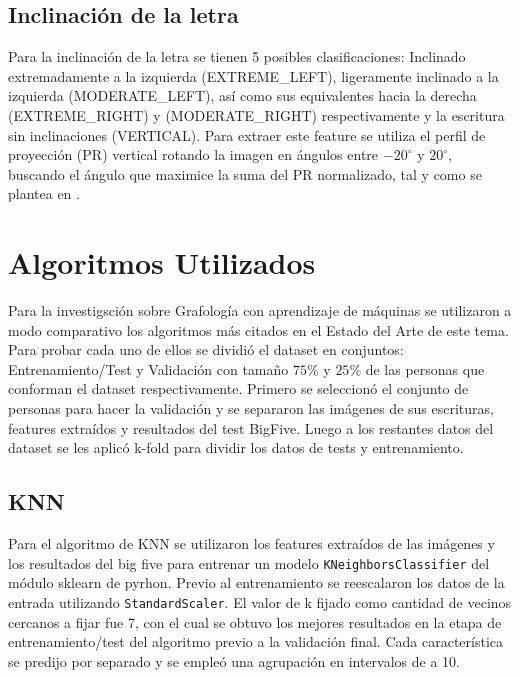 \documentclass[10pt, a4paper]{article}
\begin{document}
        \subsection{Inclinaci\'on de la letra}
            Para la inclinaci\'on de la letra se tienen 5 posibles clasificaciones: Inclinado extremadamente a la izquierda (EXTREME\_LEFT), ligeramente inclinado a la 
            izquierda (MODERATE\_LEFT), as\'i como sus equivalentes hacia la derecha (EXTREME\_RIGHT) y (MODERATE\_RIGHT) respectivamente y la escritura sin inclinaciones (VERTICAL). 
            Para extraer este feature se utiliza el perfil de proyecci\'on (PR) vertical rotando la imagen en \'angulos entre $-20^{\circ}$ y $20^{\circ}$, buscando el \'angulo que maximice
            la suma del PR normalizado, tal y como se plantea en \cite{gavrilescu2018predicting}.

    \section{Algoritmos Utilizados}
        Para la investigsci\'on sobre Grafolog\'ia con aprendizaje de m\'aquinas se utilizaron a modo comparativo los algoritmos m\'as citados en el Estado del Arte de este tema. 
        Para probar cada uno de ellos se dividi\'o el dataset en  conjuntos: Entrenamiento/Test y Validaci\'on con tama\~no $75\%$ y $25\%$ de las personas que conforman el dataset respectivamente.
        Primero se seleccion\'o el conjunto de personas para hacer la validaci\'on y se separaron las im\'agenes de sus escrituras, features extra\'idos y resultados del test BigFive. Luego a los restantes datos del dataset 
        se les aplic\'o k-fold para dividir los datos de tests y entrenamiento.  
        
        \subsection{KNN}
            Para el algoritmo de KNN se utilizaron los features extra\'idos de las im\'agenes y los resultados del big five para entrenar un modelo \texttt{KNeighborsClassifier} del m\'odulo sklearn de pyrhon. 
            Previo al entrenamiento se reescalaron los datos de la entrada utilizando \texttt{StandardScaler}. El valor de k fijado como cantidad de vecinos cercanos a fijar fue 7, con el cual se obtuvo los mejores resultados en 
            la etapa de entrenamiento/test del algoritmo previo a la validaci\'on final. Cada caracter\'istica se predijo por separado y se emple\'o una agrupaci\'on en intervalos de a 10.
        
\end{document}
